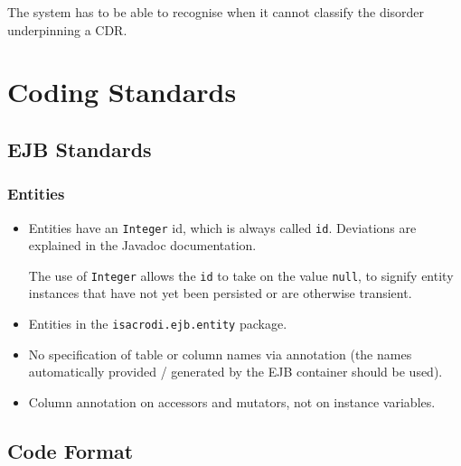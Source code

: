 \documentclass[a4paper,fleqn]{article}
\newcommand{\computercode}[1]{\texttt{#1}}
\begin{document}
The system has to be able to recognise when it cannot classify the
disorder underpinning a CDR.


\section{Coding Standards}



\subsection{EJB Standards}

\subsubsection{Entities}

\begin{itemize}

\item Entities have an \computercode{Integer} id, which is always
  called \computercode{id}. Deviations are explained in the Javadoc
  documentation.

  The use of \computercode{Integer} allows
  the \computercode{id} to take on the value \computercode{null}, to
  signify entity instances that have not yet been persisted or are
  otherwise transient.

\item Entities in the \computercode{isacrodi.ejb.entity} package.  

\item No specification of table or column names via annotation (the
  names automatically provided / generated by the EJB container should
  be used).

\item Column annotation on accessors and mutators, not on instance
  variables.

\end{itemize}


\subsection{Code Format}
\end{document}
